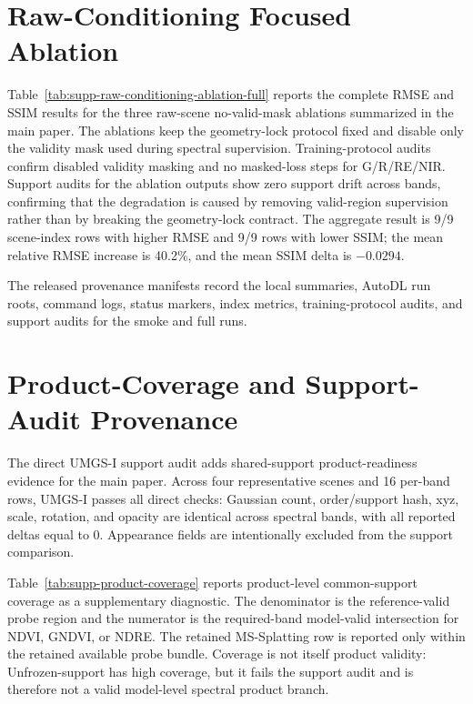 ﻿\documentclass[acmtog,anonymous,review]{acmart}
\begin{document}




\FloatBarrier

\section{Raw-Conditioning Focused Ablation}

Table~\ref{tab:supp-raw-conditioning-ablation-full} reports the complete RMSE and SSIM results for the three raw-scene no-valid-mask ablations summarized in the main paper. The ablations keep the geometry-lock protocol fixed and disable only the validity mask used during spectral supervision. Training-protocol audits confirm disabled validity masking and no masked-loss steps for G/R/RE/NIR. Support audits for the ablation outputs show zero support drift across bands, confirming that the degradation is caused by removing valid-region supervision rather than by breaking the geometry-lock contract. The aggregate result is 9/9 scene-index rows with higher RMSE and 9/9 rows with lower SSIM; the mean relative RMSE increase is 40.2\%, and the mean SSIM delta is $-0.0294$.

The released provenance manifests record the local summaries, AutoDL run roots, command logs, status markers, index metrics, training-protocol audits, and support audits for the smoke and full runs.


\FloatBarrier

\section{Product-Coverage and Support-Audit Provenance}

The direct UMGS-I support audit adds shared-support product-readiness evidence for the main paper. Across four representative scenes and 16 per-band rows, UMGS-I passes all direct checks: Gaussian count, order/support hash, xyz, scale, rotation, and opacity are identical across spectral bands, with all reported deltas equal to 0. Appearance fields are intentionally excluded from the support comparison.



Table~\ref{tab:supp-product-coverage} reports product-level common-support coverage as a supplementary diagnostic. The denominator is the reference-valid probe region and the numerator is the required-band model-valid intersection for NDVI, GNDVI, or NDRE. The retained MS-Splatting row is reported only within the retained available probe bundle. Coverage is not itself product validity: Unfrozen-support has high coverage, but it fails the support audit and is therefore not a valid model-level spectral product branch.
\FloatBarrier
\end{document}
